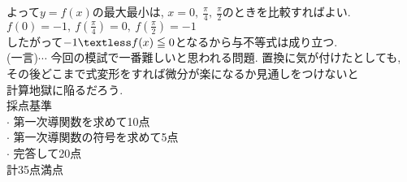 \documentclass{article}
\begin{document}
よって$y=f(x)$の最大最小は, $x=0,\ \frac{\pi}{4},\ \frac{\pi}{2}$のときを比較すればよい.\vspace{0.1in}\\
$f(0)=-1,\ f(\frac{\pi}{4})=0,\ f(\frac{\pi}{2})=-1$\vspace{0.1in}\\
したがって$-1\textless f(x)\leqq 0$となるから与不等式は成り立つ.\vspace{0.1in}\\
 (一言)$\cdots$ 今回の模試で一番難しいと思われる問題. 置換に気が付けたとしても, \\
 \hspace{0.62in}その後どこまで式変形をすれば微分が楽になるか見通しをつけないと\\
 \hspace{0.62in}計算地獄に陥るだろう.\vspace{0.2in}\\
  {\Large 採点基準}\vspace{0.1in}\\
 $\cdot$ 第一次導関数を求めて10点\vspace{0.1in}\\
 $\cdot$ 第一次導関数の符号を求めて5点\vspace{0.1in}\\
 $\cdot$ 完答して20点\vspace{0.1in}\\
計35点満点
 
\end{document}
